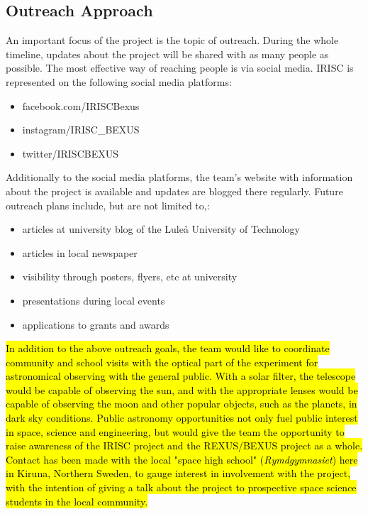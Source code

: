 
\subsection{Outreach Approach}
An important focus of the project is the topic of outreach. During the whole timeline, updates about the project will be shared with as many people as possible. The most effective way of reaching people is via social media. IRISC is represented on the following social media platforms:
\begin{itemize}
	\item facebook.com/IRISCBexus
	\item instagram/IRISC\_BEXUS
	\item twitter/IRISCBEXUS
\end{itemize}
Additionally to the social media platforms, the team's website with information about the project is available and updates are blogged there regularly.\newline\newline
Future outreach plans include, but are not limited to,:
\begin{itemize}
	\item articles at university blog of the Lule{\aa} University of Technology
	\item articles in local newspaper
	\item visibility through posters, flyers, etc at university
	\item presentations during local events
	\item applications to grants and awards
\end{itemize}

\hl{In addition to the above outreach goals, the team would like to coordinate community and school visits with the optical part of the experiment for astronomical observing with the general public. With a solar filter, the telescope would be capable of observing the sun, and with the appropriate lenses would be capable of observing the moon and other popular objects, such as the planets, in dark sky conditions. Public astronomy opportunities not only fuel public interest in space, science and engineering, but would give the team the opportunity to raise awareness of the IRISC project and the REXUS/BEXUS project as a whole.}\\
\hl{Contact has been made with the local "space high school" (\textit{Rymdgymnasiet}) here in Kiruna, Northern Sweden, to gauge interest in involvement with the project, with the intention of giving a talk about the project to prospective space science students in the local community.}